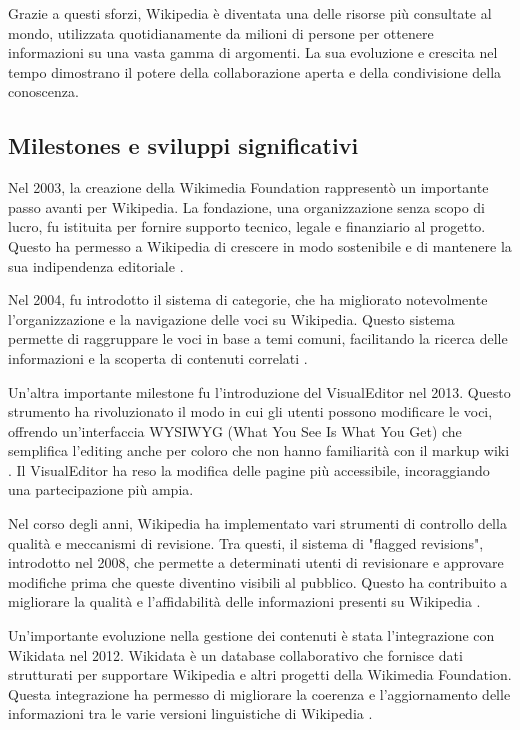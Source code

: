 \documentclass[12pt,a4paper]{report}
\begin{document}
Grazie a questi sforzi, Wikipedia è diventata una delle risorse più consultate al mondo, utilizzata quotidianamente da milioni di persone per ottenere informazioni su una vasta gamma di argomenti. La sua evoluzione e crescita nel tempo dimostrano il potere della collaborazione aperta e della condivisione della conoscenza.

\subsection{Milestones e sviluppi significativi}

Nel 2003, la creazione della Wikimedia Foundation rappresentò un importante passo avanti per Wikipedia. La fondazione, una organizzazione senza scopo di lucro, fu istituita per fornire supporto tecnico, legale e finanziario al progetto. Questo ha permesso a Wikipedia di crescere in modo sostenibile e di mantenere la sua indipendenza editoriale \cite{reagle2010good}.

Nel 2004, fu introdotto il sistema di categorie, che ha migliorato notevolmente l'organizzazione e la navigazione delle voci su Wikipedia. Questo sistema permette di raggruppare le voci in base a temi comuni, facilitando la ricerca delle informazioni e la scoperta di contenuti correlati \cite{jemielniak2014wikipedia}.

Un'altra importante milestone fu l'introduzione del VisualEditor nel 2013. Questo strumento ha rivoluzionato il modo in cui gli utenti possono modificare le voci, offrendo un'interfaccia WYSIWYG (What You See Is What You Get) che semplifica l'editing anche per coloro che non hanno familiarità con il markup wiki \cite{history_of_wikis}. Il VisualEditor ha reso la modifica delle pagine più accessibile, incoraggiando una partecipazione più ampia.

Nel corso degli anni, Wikipedia ha implementato vari strumenti di controllo della qualità e meccanismi di revisione. Tra questi, il sistema di "flagged revisions", introdotto nel 2008, che permette a determinati utenti di revisionare e approvare modifiche prima che queste diventino visibili al pubblico. Questo ha contribuito a migliorare la qualità e l'affidabilità delle informazioni presenti su Wikipedia \cite{denning2005wikipedia}.

Un'importante evoluzione nella gestione dei contenuti è stata l'integrazione con Wikidata nel 2012. Wikidata è un database collaborativo che fornisce dati strutturati per supportare Wikipedia e altri progetti della Wikimedia Foundation. Questa integrazione ha permesso di migliorare la coerenza e l'aggiornamento delle informazioni tra le varie versioni linguistiche di Wikipedia \cite{history_of_wikis}.
\end{document}
